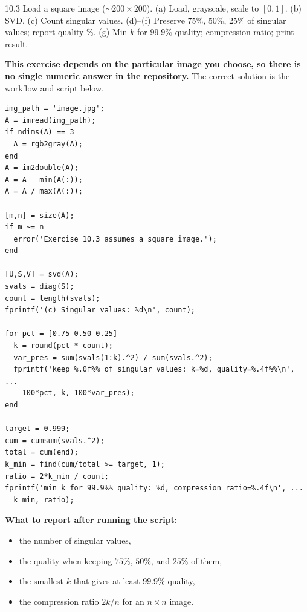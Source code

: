 \begin{exercise}{10.3}
Load a square image ($\sim200\times200$). (a) Load, grayscale, scale to $[0,1]$. (b) SVD. (c) Count singular values. (d)--(f) Preserve 75\%, 50\%, 25\% of singular values; report quality \%. (g) Min $k$ for 99.9\% quality; compression ratio; print result.
\end{exercise}
\begin{solution}
\textbf{This exercise depends on the particular image you choose, so there is no single numeric answer in the repository.} The correct solution is the workflow and script below.

\begin{lstlisting}
img_path = 'image.jpg';
A = imread(img_path);
if ndims(A) == 3
  A = rgb2gray(A);
end
A = im2double(A);
A = A - min(A(:));
A = A / max(A(:));

[m,n] = size(A);
if m ~= n
  error('Exercise 10.3 assumes a square image.');
end

[U,S,V] = svd(A);
svals = diag(S);
count = length(svals);
fprintf('(c) Singular values: %d\n', count);

for pct = [0.75 0.50 0.25]
  k = round(pct * count);
  var_pres = sum(svals(1:k).^2) / sum(svals.^2);
  fprintf('keep %.0f%% of singular values: k=%d, quality=%.4f%%\n', ...
    100*pct, k, 100*var_pres);
end

target = 0.999;
cum = cumsum(svals.^2);
total = cum(end);
k_min = find(cum/total >= target, 1);
ratio = 2*k_min / count;
fprintf('min k for 99.9%% quality: %d, compression ratio=%.4f\n', ...
  k_min, ratio);
\end{lstlisting}

\textbf{What to report after running the script:}
\begin{itemize}
  \item the number of singular values,
  \item the quality when keeping $75\%$, $50\%$, and $25\%$ of them,
  \item the smallest $k$ that gives at least $99.9\%$ quality,
  \item the compression ratio $2k/n$ for an $n\times n$ image.
\end{itemize}
\end{solution}

